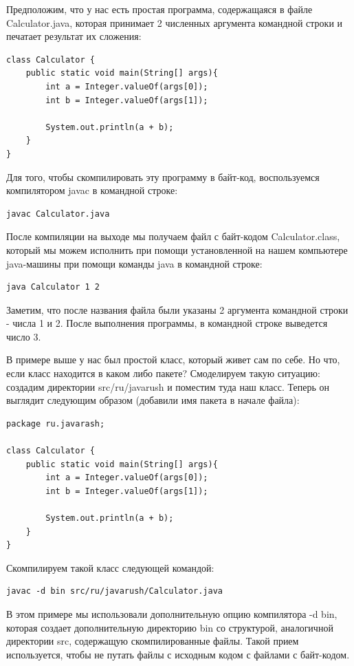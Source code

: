 \documentclass[]{scrartcl}
\begin{document}
Предположим, что у нас есть простая программа, содержащаяся в файле Calculator.java, которая принимает 2 численных аргумента командной строки и печатает результат их сложения:

\begin{lstlisting}
class Calculator {
	public static void main(String[] args){
		int a = Integer.valueOf(args[0]);
		int b = Integer.valueOf(args[1]);

		System.out.println(a + b);
	}
}
\end{lstlisting}

Для того, чтобы скомпилировать эту программу в байт-код, воспользуемся компилятором javac в командной строке:

\begin{lstlisting}
javac Calculator.java
\end{lstlisting}

После компиляции на выходе мы получаем файл с байт-кодом Calculator.class, который мы можем исполнить при помощи установленной на нашем компьютере java-машины при помощи команды java в командной строке:

\begin{lstlisting}
java Calculator 1 2
\end{lstlisting}

Заметим, что после названия файла были указаны 2 аргумента командной строки - числа 1 и 2. После выполнения программы, в командной строке выведется число 3.

В примере выше у нас был простой класс, который живет сам по себе. Но что, если класс находится в каком либо пакете? Смоделируем такую ситуацию: создадим директории src/ru/javarush и поместим туда наш класс. Теперь он выглядит следующим образом (добавили имя пакета в начале файла):

\begin{lstlisting}
package ru.javarash;

class Calculator {
	public static void main(String[] args){
		int a = Integer.valueOf(args[0]);
		int b = Integer.valueOf(args[1]);

		System.out.println(a + b);
	}
}
\end{lstlisting}

Скомпилируем такой класс следующей командой:

\begin{lstlisting}
javac -d bin src/ru/javarush/Calculator.java
\end{lstlisting}

В этом примере мы использовали дополнительную опцию компилятора -d bin, которая создает дополнительную директорию bin со структурой, аналогичной директории src, содержащую скомпилированные файлы. Такой прием используется, чтобы не путать файлы с исходным кодом с файлами с байт-кодом.
\end{document}
